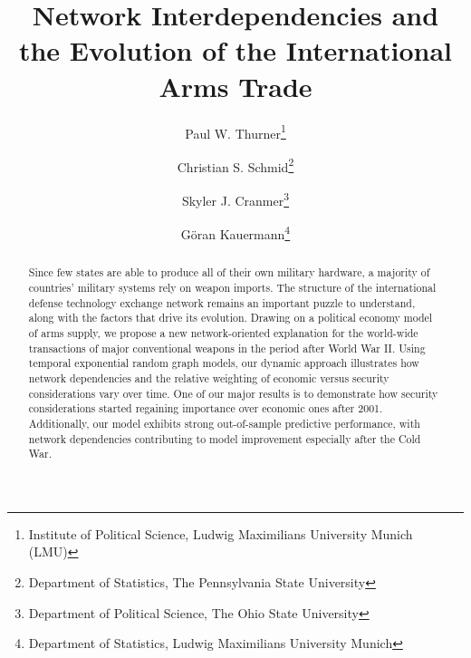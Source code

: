 \documentclass[12pt, letterpaper]{article}
\numberwithin{equation}{section}
\begin{document}

\title{Network Interdependencies and the Evolution of the International Arms Trade
}
\author{Paul W. Thurner\footnote{Institute of Political Science, Ludwig Maximilians University Munich (LMU)}\and Christian S. Schmid\footnote{Department of Statistics, The Pennsylvania State University} \and Skyler J. Cranmer\footnote{Department of Political Science, The Ohio State University}  \and G\"oran Kauermann\footnote{Department of Statistics, Ludwig Maximilians University Munich}}



\maketitle


    

\begin{abstract}
\doublespacing
\noindent Since few states are able to produce all of their own military hardware, a majority of countries’ military systems rely on weapon imports. The structure of the international defense technology exchange network remains an important puzzle to understand, along with the factors that drive its evolution. Drawing on a political economy model of arms supply, we propose a new network-oriented explanation for the world-wide transactions of major conventional weapons in the period after World War II. Using temporal exponential random graph models, our dynamic approach illustrates how network dependencies and the relative weighting of economic versus security considerations vary over time. One of our major results is to demonstrate how security considerations started regaining importance over economic ones after 2001. Additionally, our model exhibits strong out-of-sample predictive performance, with network dependencies contributing to model improvement especially after the Cold War.
\end{abstract}
    
\end{document}
